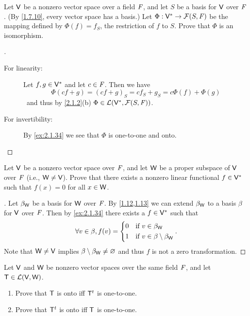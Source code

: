 \begin{ex}\label{ex:2.6.18}
  Let \(\mathsf{V}\) be a nonzero vector space over a field \(\mathit{F}\), and let \(S\) be a basis for \(\mathsf{V}\) over \(\mathit{F}\).
  (By \cref{1.7.10}, every vector space has a basis.)
  Let \(\Phi : \mathsf{V}^* \to \mathcal{F}(S, \mathit{F})\) be the mapping defined by \(\Phi(f) = f_S\), the restriction of \(f\) to \(S\).
  Prove that \(\Phi\) is an isomorphism.
\end{ex}

\begin{proof}[]
  \begin{description}
    \item[For linearity:]
      Let \(f, g \in \mathsf{V}^*\) and let \(c \in \mathit{F}\).
      Then we have
      \[
        \Phi(cf + g) = (cf + g)_S = c f_S + g_S = c \Phi(f) + \Phi(g)
      \]\
      and thus by \cref{2.1.2}(b) \(\Phi \in \mathcal{L}(\mathsf{V}^*, \mathcal{F}(S, \mathit{F}))\).
    \item[For invertibility:]
      By \cref{ex:2.1.34} we see that \(\Phi\) is one-to-one and onto.
  \end{description}
\end{proof}

\begin{ex}\label{ex:2.6.19}
  Let \(\mathsf{V}\) be a nonzero vector space over \(\mathit{F}\), and let \(\mathsf{W}\) be a proper subspace of \(\mathsf{V}\) over \(\mathit{F}\)
  (i.e., \(\mathsf{W} \neq \mathsf{V}\)).
  Prove that there exists a nonzero linear functional \(f \in \mathsf{V}^*\) such that \(f(x) = 0\) for all \(x \in \mathsf{W}\).
\end{ex}

\begin{proof}[]
  Let \(\beta_{\mathsf{W}}\) be a basis for \(\mathsf{W}\) over \(\mathit{F}\).
  By \cref{1.12,1.13} we can extend \(\beta_{\mathsf{W}}\) to a basis \(\beta\) for \(\mathsf{V}\) over \(\mathit{F}\).
  Then by \cref{ex:2.1.34} there exists a \(f \in \mathsf{V}^*\) such that
  \[
    \forall v \in \beta, f(v) = \begin{dcases}
      0 & \text{if } v \in \beta_{\mathsf{W}}                 \\
      1 & \text{if } v \in \beta \setminus \beta_{\mathsf{W}}
    \end{dcases}.
  \]
  Note that \(\mathsf{W} \neq \mathsf{V}\) implies \(\beta \setminus \beta_{\mathsf{W}} \neq \varnothing\) and thus \(f\) is not a zero transformation.
\end{proof}

\begin{ex}\label{ex:2.6.20}
  Let \(\mathsf{V}\) and \(\mathsf{W}\) be nonzero vector spaces over the same field \(\mathit{F}\), and let \(\mathsf{T} \in \mathcal{L}(\mathsf{V}, \mathsf{W})\).
  \begin{enumerate}
    \item Prove that \(\mathsf{T}\) is onto iff \({\mathsf{T}}^{t}\) is one-to-one.
    \item Prove that \({\mathsf{T}}^{t}\) is onto iff \(\mathsf{T}\) is one-to-one.
  \end{enumerate}
\end{ex}

